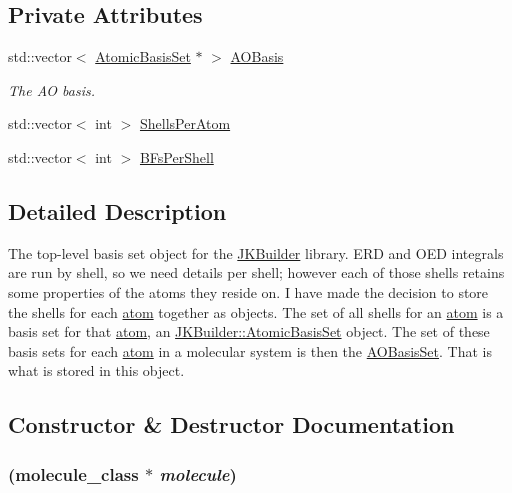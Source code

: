 \subsection*{Private Attributes}
\begin{DoxyCompactItemize}
\item 
std::vector$<$ \hyperlink{classJKBuilder_1_1AtomicBasisSet}{AtomicBasisSet} $\ast$ $>$ \hyperlink{classJKBuilder_1_1AOBasisSet_a872dee545656a5acc39da552c8e5137f}{AOBasis}
\begin{DoxyCompactList}\small\item\em The AO basis. \item\end{DoxyCompactList}\item 
std::vector$<$ int $>$ \hyperlink{classJKBuilder_1_1AOBasisSet_a82f86f036166d7d52ed2aea14bfe8510}{ShellsPerAtom}
\item 
std::vector$<$ int $>$ \hyperlink{classJKBuilder_1_1AOBasisSet_a8d80fa437dbb830552ffe2a6b07630fb}{BFsPerShell}
\end{DoxyCompactItemize}


\subsection{Detailed Description}
The top-\/level basis set object for the \hyperlink{namespaceJKBuilder}{JKBuilder} library. ERD and OED integrals are run by shell, so we need details per shell; however each of those shells retains some properties of the atoms they reside on. I have made the decision to store the shells for each \hyperlink{classJKBuilder_1_1atom}{atom} together as objects. The set of all shells for an \hyperlink{classJKBuilder_1_1atom}{atom} is a basis set for that \hyperlink{classJKBuilder_1_1atom}{atom}, an \hyperlink{classJKBuilder_1_1AtomicBasisSet}{JKBuilder::AtomicBasisSet} object. The set of these basis sets for each \hyperlink{classJKBuilder_1_1atom}{atom} in a molecular system is then the \hyperlink{classJKBuilder_1_1AOBasisSet}{AOBasisSet}. That is what is stored in this object. 

\subsection{Constructor \& Destructor Documentation}
\hypertarget{classJKBuilder_1_1AOBasisSet_ae37ea5df793e15317b741ddef3065f3a}{
\subsubsection[{AOBasisSet}]{ ({\bf molecule\_\-class} $\ast$ {\em molecule})}}
\label{classJKBuilder_1_1AOBasisSet_ae37ea5df793e15317b741ddef3065f3a}


